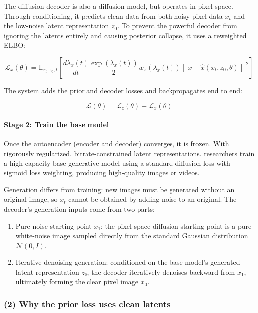 The diffusion decoder is also a diffusion model, but operates in pixel space. Through conditioning, it predicts clean data from both noisy pixel data \(x_t\) and the low-noise latent representation \(z_0\). To prevent the powerful decoder from ignoring the latents entirely and causing posterior collapse, it uses a reweighted ELBO:

\[
\mathcal{L}_x(\theta)=
\mathbb{E}_{x_t,z_0,t}
\left[
\frac{d\lambda_x(t)}{dt}
\frac{\exp(\lambda_x(t))}{2}
w_x(\lambda_x(t))
\left\|
x-\hat{x}(x_t,z_0,\theta)
\right\|^2
\right]
\]

The system adds the prior and decoder losses and backpropagates end to end:

\[
\mathcal{L}(\theta)=\mathcal{L}_z(\theta)+\mathcal{L}_x(\theta)
\]

\hypertarget{stage-2-train-the-base-model}{%
\paragraph{Stage 2: Train the base model}\label{stage-2-train-the-base-model}}

Once the autoencoder (encoder and decoder) converges, it is frozen. With rigorously regularized, bitrate-constrained latent representations, researchers train a high-capacity base generative model using a standard diffusion loss with sigmoid loss weighting, producing high-quality images or videos.

Generation differs from training: new images must be generated without an original image, so \(x_t\) cannot be obtained by adding noise to an original. The decoder's generation inputs come from two parts:

\begin{enumerate}
\def\labelenumi{\arabic{enumi}.}
\tightlist
\item
  Pure-noise starting point \(x_1\): the pixel-space diffusion starting point is a pure white-noise image sampled directly from the standard Gaussian distribution \(\mathcal{N}(0,I)\).
\item
  Iterative denoising generation: conditioned on the base model's generated latent representation \(z_0\), the decoder iteratively denoises backward from \(x_1\), ultimately forming the clear pixel image \(x_0\).
\end{enumerate}

\hypertarget{why-the-prior-loss-uses-clean-latents}{%
\subsubsection{(2) Why the prior loss uses clean latents}\label{why-the-prior-loss-uses-clean-latents}}

